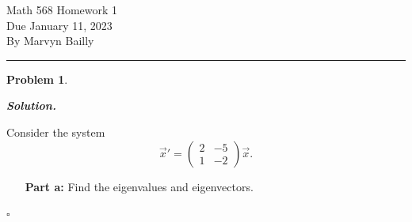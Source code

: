 \documentclass[12pt]{report}
\newtheorem{problem}{Problem}
\newenvironment{solution}[1][\it{Solution}]{\textbf{#1. } }{$\square$}
\begin{document}
\large

\begin{center}
 Math 568 Homework 1\\
 Due January 11, 2023\\
 By Marvyn Bailly\\
\end{center}

\normalsize

\hrule



\begin{problem}
    
\end{problem}

\begin{solution}

    
    \noindent
    Consider the system
    \[ \vec{x}' = \begin{pmatrix}
        2 & -5\\
        1 & -2
    \end{pmatrix}\vec{x}.\]
    \begin{enumerate}
        \item [{\bf Part a:}] Find the eigenvalues and eigenvectors.
        

\end{enumerate}
\end{solution}
\end{document}
